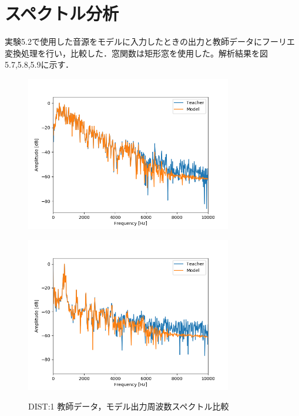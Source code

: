 \documentclass{jreport}		%
\begin{document}
\clearpage

\section{スペクトル分析}
実験5.2で使用した音源をモデルに入力したときの出力と教師データにフーリエ変換処理を行い，比較した．窓関数は矩形窓を使用した。解析結果を図5.7,5.8,5.9に示す．

\begin{figure}[htbp]
 \begin{minipage}{0.5\hsize}
 \begin{center}
  \includegraphics[width=90mm]{gain1_fft_hikaku.png}
 \end{center}
 \label{fig:one}
 \end{minipage}
 \begin{minipage}{0.5\hsize}
 \begin{center}
  \includegraphics[width=90mm]{gain1_fft_hikaku2.png}
 \end{center}
 \label{fig:two}
 \end{minipage}
 \caption{DIST:1 教師データ，モデル出力周波数スペクトル比較}
\end{figure}
\end{document}
